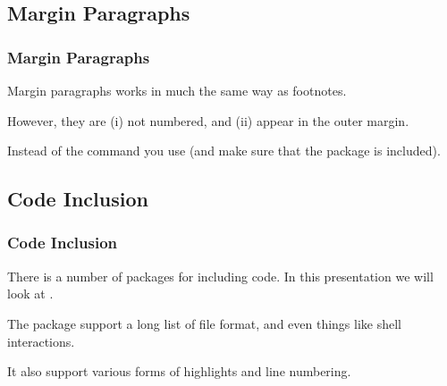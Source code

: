 \subsection{Margin Paragraphs}
\begin{frame}[fragile]
  \frametitle{Margin Paragraphs}
  \vspace{3mm}
  Margin paragraphs works in much the same way as footnotes.
  
  \vspace{5mm}
  However, they are (i) not numbered, and (ii) appear in the outer margin.
  
  \vspace{5mm}
  Instead of the  command you use  (and make sure that the  package is included).
  
\end{frame}

\subsection{Code Inclusion}
\begin{frame}[fragile]
  \frametitle{Code Inclusion}
  \vspace{3mm}
  There is a number of packages for including code. In this presentation we will look at .
  
  \vspace{5mm}
  The  package support a long list of file format, and even things like shell interactions.
  
  \vspace{5mm}
  It also support various forms of highlights and line numbering.
\end{frame}

